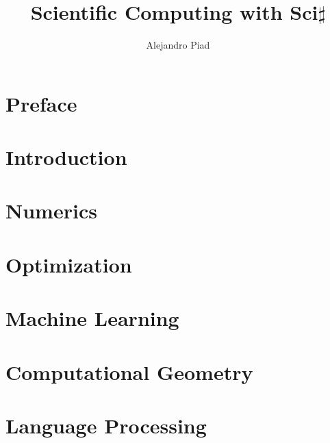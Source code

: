 \documentclass[10pt,a4paper]{report}
\author{Alejandro Piad}
\title{\Huge Scientific Computing with Sci$\sharp$}
\begin{document}

\maketitle
\tableofcontents
\listoffigures
\listoftables

\chapter*{Preface}
 

\chapter{Introduction}
\label{chap:introduction}

\chapter{Numerics}
\label{chap:numerics}

\chapter{Optimization}
\label{chap:optimization}

\chapter{Machine Learning}
\label{chap:machine-learning}

\chapter{Computational Geometry}
\label{chap:geometry}
 

\chapter{Language Processing}
\label{chap:language}
 
 
\end{document}
